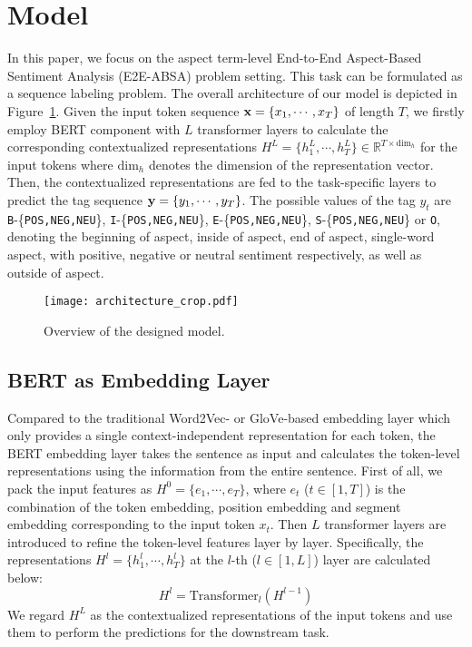 \documentclass[11pt,a4paper]{article}
\begin{document}
\section{Model}
In this paper, we focus on the aspect term-level End-to-End Aspect-Based Sentiment Analysis (E2E-ABSA) problem setting. This task can be formulated as a sequence labeling problem. The overall architecture of our model is depicted in Figure~\ref{fig:architecture}. Given the input token sequence $\mathrm{\bf x} = \{x_1, \cdots, x_T \}$ of length $T$, we firstly employ BERT component with $L$ transformer layers to calculate the corresponding contextualized representations $H^{L} = \{h^L_1, \cdots, h^L_T\} \in \mathbb{R}^{T \times \mathrm{dim}_h}$ for the input tokens where $\mathrm{dim}_h$ denotes the dimension of the representation vector. Then, the contextualized representations are fed to the task-specific layers to predict the tag sequence $\mathrm{\bf y} = \{y_1, \cdots, y_T\}$. The possible values of the tag $y_t$ are \texttt{B}-\{\texttt{POS,NEG,NEU}\}, \texttt{I}-\{\texttt{POS,NEG,NEU}\}, \texttt{E}-\{\texttt{POS,NEG,NEU}\}, \texttt{S}-\{\texttt{POS,NEG,NEU}\} or \texttt{O}, denoting the beginning of aspect, inside of aspect, end of aspect, single-word aspect, with positive, negative or neutral sentiment respectively, as well as outside of aspect.

\begin{figure}
    \centering
    \texttt{[image: architecture\_crop.pdf]}
    \caption{Overview of the designed model.}
    \label{fig:architecture}
\end{figure}

\subsection{BERT as Embedding Layer}
Compared to the traditional Word2Vec- or GloVe-based embedding layer which only provides a single context-independent representation for each token, the BERT embedding layer takes the sentence as input and calculates the token-level representations using the information from the entire sentence. First of all, we pack the input features as $H^0 = \{e_1,\cdots,e_T\}$, where $e_t$ ($t\in[1, T]$) is the combination of the token embedding, position embedding and segment embedding corresponding to the input token $x_t$. Then $L$ transformer layers are introduced to refine the token-level features layer by layer. Specifically, the representations $H^{l} = \{h^l_1, \cdots, h^l_T\}$ at the $l$-th ($l \in [1, L]$) layer are calculated below:
\begin{equation}
\label{eq:bert}
    H^l = \text{Transformer}_l(H^{l-1})
\end{equation}
We regard $H^L$ as the contextualized representations of the input tokens and use them to perform the predictions for the downstream task. 
\end{document}
